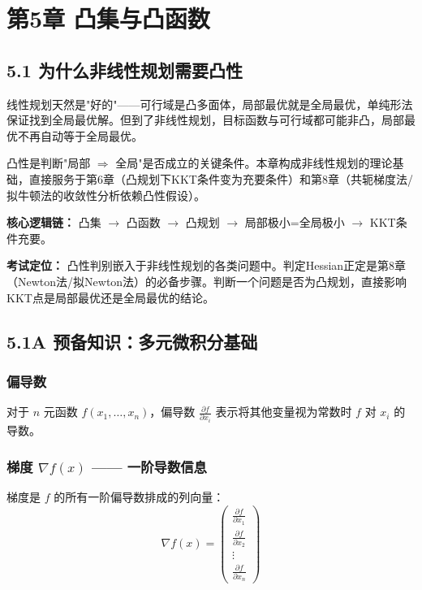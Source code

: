 \section{第5章 \quad 凸集与凸函数}

\subsection{5.1 为什么非线性规划需要凸性}

线性规划天然是"好的"——可行域是凸多面体，局部最优就是全局最优，单纯形法保证找到全局最优解。但到了非线性规划，目标函数与可行域都可能非凸，局部最优不再自动等于全局最优。

凸性是判断"局部 $\Rightarrow$ 全局"是否成立的关键条件。本章构成非线性规划的理论基础，直接服务于第6章（凸规划下KKT条件变为充要条件）和第8章（共轭梯度法/拟牛顿法的收敛性分析依赖凸性假设）。

\textbf{核心逻辑链：} 凸集 $\to$ 凸函数 $\to$ 凸规划 $\to$ 局部极小=全局极小 $\to$ KKT条件充要。

\textbf{考试定位：} 凸性判别嵌入于非线性规划的各类问题中。判定Hessian正定是第8章（Newton法/拟Newton法）的必备步骤。判断一个问题是否为凸规划，直接影响KKT点是局部最优还是全局最优的结论。

\subsection{5.1A 预备知识：多元微积分基础}

\subsubsection{偏导数}

对于 $n$ 元函数 $f(x_1,\dots,x_n)$，偏导数 $\frac{\partial f}{\partial x_i}$ 表示将其他变量视为常数时 $f$ 对 $x_i$ 的导数。

\subsubsection{梯度 $\nabla f(x)$ —— 一阶导数信息}

梯度是 $f$ 的所有一阶偏导数排成的列向量：
\[
\nabla f(x) = \begin{pmatrix}
\frac{\partial f}{\partial x_1} \\
\frac{\partial f}{\partial x_2} \\
\vdots \\
\frac{\partial f}{\partial x_n}
\end{pmatrix}
\]

